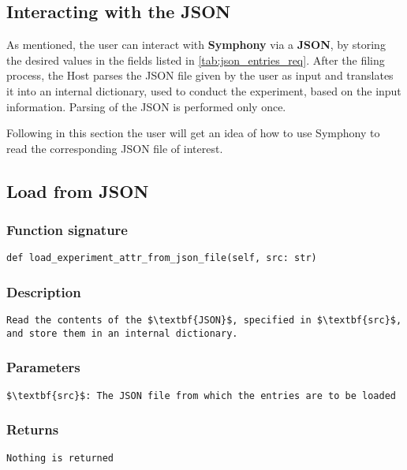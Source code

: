 \subsection{Interacting with the JSON}
As mentioned, the user can interact with \textbf{Symphony} via a \textbf{JSON}, by storing the desired values in the fields listed in \autoref{tab:json_entries_req}. After the filing process, the Host parses the JSON file given by the user as input and translates it into an internal dictionary, used to conduct the experiment, based on the input information. Parsing of the JSON is performed only once.

Following in this section the user will get an idea of how to use Symphony to read the corresponding JSON file of interest. 

\subsection{Load from JSON}
\subsubsection{Function signature}

\begin{lstlisting}
def load_experiment_attr_from_json_file(self, src: str)
\end{lstlisting}

\subsubsection{Description}
\begin{lstlisting}[mathescape=true, keywordstyle=\color{black}]
Read the contents of the $\textbf{JSON}$, specified in $\textbf{src}$, 
and store them in an internal dictionary. 
\end{lstlisting}

\subsubsection{Parameters}
\begin{lstlisting}[mathescape=true, keywordstyle=\color{black}]
$\textbf{src}$: The JSON file from which the entries are to be loaded
\end{lstlisting}

\subsubsection{Returns}
\begin{lstlisting}[mathescape=true, keywordstyle=\color{black}]
Nothing is returned
\end{lstlisting}

